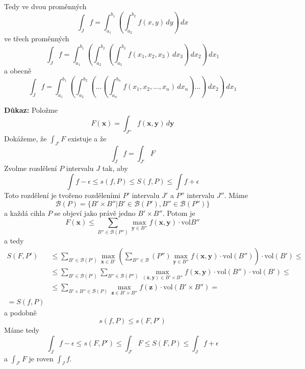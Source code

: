 \documentclass[10pt]{article}
\begin{document}
\vspace{10mm}
\noindent
Tedy ve dvou proměnných
\[ \int_{J} f = \int_{a_1}^{b_1} \left( \int_{a_2}^{b_2} f(x,y) \,dy \right) \,dx \]
ve třech proměnných
\[ \int_{J} f =
\int_{a_1}^{b_1} \left(
\int_{a_2}^{b_2} \left(
\int_{a_3}^{b_3} f(x_1, x_2, x_3) \,dx_3 \right) \,dx_2 \right) \,dx_1 \]
a obecně
\[ \int_{J} f =
\int_{a_1}^{b_1} \left(
\int_{a_2}^{b_2} \left(
\dots \left(
\int_{a_n}^{b_n} f(x_1, x_2, ..., x_n) \,dx_n \right) \dots \right) \,dx_2 \right) \,dx_1 \]

\vspace{5mm}
\noindent
\textbf{Důkaz:}
Položme
\[ F(\mathbf{x}) = \int_{J''} f(\mathbf{x}, \mathbf{y}) \,d\mathbf{y} \]
Dokážeme, že $\int_{J'} F$ existuje a že
\[ \int_{J} f = \int_{J'} F \]
Zvolme rozdělení $P$ intervalu $J$ tak, aby
\[ \int f - \epsilon \leq s(f,P) \leq S(f,P) \leq \int f + \epsilon \]
Toto rozdělení je tvořeno rozděleními $P'$ intervalu $J'$ a $P''$ intervalu $J''$. Máme
\[ \mathcal{B}(P) = \{ B' \times B'' | B' \in \mathcal{B}(P'), B'' \in \mathcal{B}(P'') \} \]
a každá cihla $P$ se objeví jako právě jedno $B' \times B''$. Potom je
\[ F(\mathbf{x}) \leq \sum_{B''\in \mathcal{B}(P'')}
\max_{\mathbf{y} \in B''} f(\mathbf{x}, \mathbf{y}) \cdot \textrm{vol}B'' \]
a tedy
\begin{align*}
    S(F, P')
    &\leq \sum_{B' \in \mathcal{B}(P')} \max_{\mathbf{x}\in B'}
    \left( \sum_{B'' \in \mathcal{B}}(P'') \max_{\mathbf{y}\in B''}
    f(\mathbf{x}, \mathbf{y}) \cdot \textrm{vol}(B'')\right) \cdot \textrm{vol}(B') \leq\\
    &\leq \sum_{B' \in \mathcal{B}(P')} \sum_{B'' \in \mathcal{B}(P'')}
    \max_{(\mathbf{x}, \mathbf{y}) \in B' \times B''} f(\mathbf{x}, \mathbf{y})
    \cdot \textrm{vol}(B'') \cdot \textrm{vol}(B') \leq\\
    &\leq \sum_{B' \times B'' \in \mathcal{B}(P)} \max_{\mathbf{z}\in B' \times B''}
    f(\mathbf{z}) \cdot \textrm{vol}(B' \times B'') =\\
    = S(f,P)
\end{align*}
a podobně
\[ s(f,P) \leq s(F,P') \]
Máme tedy
\[ \int_{J} f - \epsilon \leq s(F,P') \leq \int_{J'} F \leq S(F,P) \leq \int_{J} f + \epsilon \]
a $\int_{J'} F$ je roven $\int_{J} f$.

\end{document}
